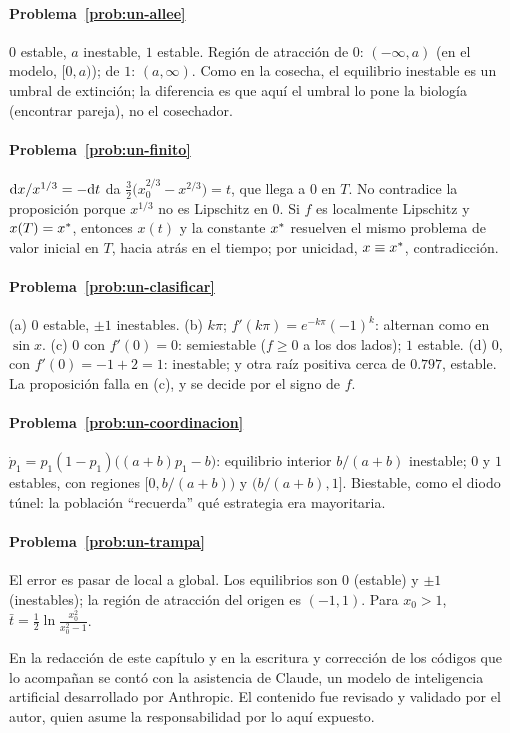 \paragraph{Problema~\ref{prob:un-allee}}
$0$ estable, $a$ inestable, $1$ estable. Región de atracción de $0$: $(-\infty,a)$ (en el modelo, $[0,a)$); de $1$: $(a,\infty)$. Como en la cosecha, el equilibrio inestable es un umbral de extinción; la diferencia es que aquí el umbral lo pone la biología (encontrar pareja), no el cosechador.

\paragraph{Problema~\ref{prob:un-finito}}
$\mathrm{d} x/x^{1/3}=-\mathrm{d} t$ da $\tfrac32\bigl(x_0^{2/3}-x^{2/3}\bigr)=t$, que llega a $0$ en $T$. No contradice la proposición porque $x^{1/3}$ no es Lipschitz en $0$. Si $f$ es localmente Lipschitz y $x(T)=x^{*}$, entonces $x(t)$ y la constante $x^{*}$ resuelven el mismo problema de valor inicial en $T$, hacia atrás en el tiempo; por unicidad, $x\equiv x^{*}$, contradicción.

\paragraph{Problema~\ref{prob:un-clasificar}}
(a) $0$ estable, $\pm1$ inestables. (b) $k\pi$; $f'(k\pi)=e^{-k\pi}(-1)^k$: alternan como en $\sin x$. (c) $0$ con $f'(0)=0$: semiestable ($f\ge0$ a los dos lados); $1$ estable. (d) $0$, con $f'(0)=-1+2=1$: inestable; y otra raíz positiva cerca de $0.797$, estable. La proposición falla en (c), y se decide por el signo de $f$.

\paragraph{Problema~\ref{prob:un-coordinacion}}
$\dot p_1=p_1(1-p_1)\bigl((a+b)p_1-b\bigr)$: equilibrio interior $b/(a+b)$ inestable; $0$ y $1$ estables, con regiones $[0,b/(a+b))$ y $(b/(a+b),1]$. Biestable, como el diodo túnel: la población ``recuerda'' qué estrategia era mayoritaria.

\paragraph{Problema~\ref{prob:un-trampa}}
El error es pasar de local a global. Los equilibrios son $0$ (estable) y $\pm1$ (inestables); la región de atracción del origen es $(-1,1)$. Para $x_0>1$, $\bar t=\tfrac12\ln\frac{x_0^2}{x_0^2-1}$.

\respuestaspausas

\begin{parallevar}
En la redacción de este capítulo y en la escritura y corrección de los códigos que lo acompañan se contó con la asistencia de Claude, un modelo de inteligencia artificial desarrollado por Anthropic. El contenido fue revisado y validado por el autor, quien asume la responsabilidad por lo aquí expuesto.
\end{parallevar}
